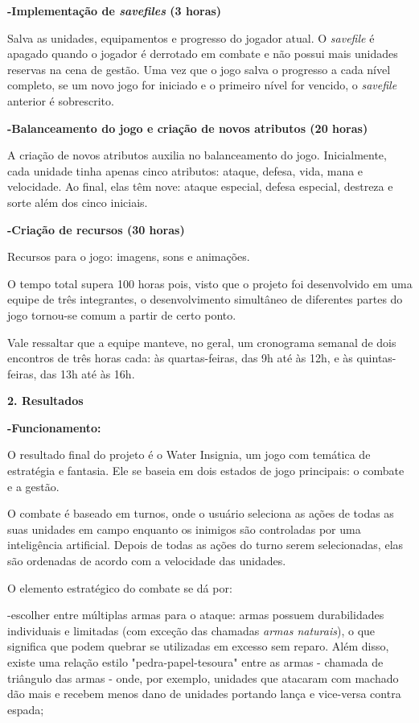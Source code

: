 \documentclass{article}
\begin{document}
\bigskip
\quad\textbf{-Implementação de \textit{savefiles} (3 horas)}

\qquad Salva as unidades, equipamentos e progresso do jogador atual. O \textit{savefile} é apagado quando o jogador é derrotado em combate e não possui mais unidades reservas na cena de gestão. Uma vez que o jogo salva o progresso a cada nível completo, se um novo jogo for iniciado e o primeiro nível for vencido, o \textit{savefile} anterior é sobrescrito.

\bigskip
\quad\textbf{-Balanceamento do jogo e criação de novos atributos (20 horas)}

\qquad A criação de novos atributos auxilia no balanceamento do jogo. Inicialmente, cada unidade tinha apenas cinco atributos: ataque, defesa, vida, mana e velocidade. Ao final, elas têm nove: ataque especial, defesa especial, destreza e sorte além dos cinco iniciais.

\bigskip
\quad\textbf{-Criação de recursos (30 horas)}

\qquad Recursos para o jogo: imagens, sons e animações.

\bigskip
\quad O tempo total supera 100 horas pois, visto que o projeto foi desenvolvido em uma equipe de três integrantes, o desenvolvimento simultâneo de diferentes partes do jogo tornou-se comum a partir de certo ponto.

\quad Vale ressaltar que a equipe manteve, no geral, um cronograma semanal de dois encontros de três horas cada: às quartas-feiras, das 9h até às 12h, e às quintas-feiras, das 13h até às 16h.

\bigskip
\bigskip
\textbf{\large{2. Resultados}}

\bigskip
\quad\textbf{-Funcionamento:}

\qquad O resultado final do projeto é o Water Insignia, um jogo com temática de estratégia e fantasia. Ele se baseia em dois estados de jogo principais: o combate e a gestão.

\qquad O combate é baseado em turnos, onde o usuário seleciona as ações de todas as suas unidades em campo enquanto os inimigos são controladas por uma inteligência artificial. Depois de todas as ações do turno serem selecionadas, elas são ordenadas de acordo com a velocidade das unidades.

\qquad O elemento estratégico do combate se dá por:

\qquad -escolher entre múltiplas armas para o ataque: armas possuem durabilidades individuais e limitadas (com exceção das chamadas \textit{armas naturais}), o que significa que podem quebrar se utilizadas em excesso sem reparo. Além disso, existe uma relação estilo "pedra-papel-tesoura" entre as armas - chamada de triângulo das armas - onde, por exemplo, unidades que atacaram com machado dão mais e recebem menos dano de unidades portando lança e vice-versa contra espada;
\end{document}
